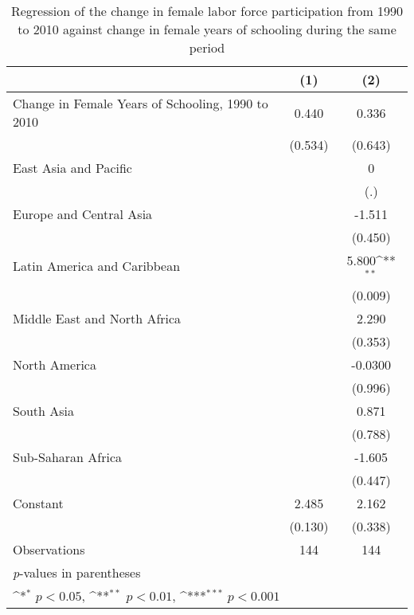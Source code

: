 \begin{table}[htbp]\centering
\def\sym#1{\ifmmode^{#1}\else\(^{#1}\)\fi}
\caption{Regression of the change in female labor force participation from 1990 to 2010 against change in female years of schooling during the same period  \label{tab1}}
\begin{tabular*}{\hsize}{@{\hskip\tabcolsep\extracolsep\fill}l*{2}{c}}
\toprule
                    &\multicolumn{1}{c}{(1)}         &\multicolumn{1}{c}{(2)}         \\
\midrule
Change in Female Years of Schooling, 1990 to 2010&       0.440         &       0.336         \\
                    &     (0.534)         &     (0.643)         \\
\addlinespace
East Asia and Pacific&                     &           0         \\
                    &                     &         (.)         \\
\addlinespace
Europe and Central Asia&                     &      -1.511         \\
                    &                     &     (0.450)         \\
\addlinespace
Latin America and Caribbean&                     &       5.800\sym{**} \\
                    &                     &     (0.009)         \\
\addlinespace
Middle East and North Africa&                     &       2.290         \\
                    &                     &     (0.353)         \\
\addlinespace
North America       &                     &     -0.0300         \\
                    &                     &     (0.996)         \\
\addlinespace
South Asia          &                     &       0.871         \\
                    &                     &     (0.788)         \\
\addlinespace
Sub-Saharan Africa  &                     &      -1.605         \\
                    &                     &     (0.447)         \\
\addlinespace
Constant            &       2.485         &       2.162         \\
                    &     (0.130)         &     (0.338)         \\
\midrule
Observations        &         144         &         144         \\
\bottomrule
\multicolumn{3}{l}{\footnotesize \textit{p}-values in parentheses}\\
\multicolumn{3}{l}{\footnotesize \sym{*} \(p<0.05\), \sym{**} \(p<0.01\), \sym{***} \(p<0.001\)}\\
\end{tabular*}
\end{table}
